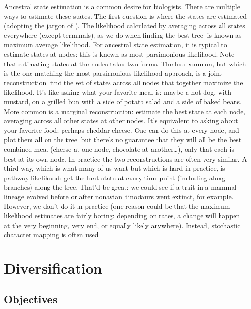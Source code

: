 \documentclass[]{article}
\begin{document}
Ancestral state estimation is a common desire for biologists. There are multiple ways to estimate these states. The first question is where the states are estimated (adopting the jargon of \citet{steel_parsimony_2000}). The likelihood calculated by averaging across all states everywhere (except terminals), as we do when finding the best tree, is known as maximum average likelihood. For ancestral state estimation, it is typical to estimate states at nodes: this is known as most-parsimonious likelihood. Note that estimating states at the nodes takes two forms. The less common, but which is the one matching the most-parsimonious likelihood approach, is a joint reconstruction: find the set of states across all nodes that together maximize the likelihood. It's like asking what your favorite meal is: maybe a hot dog, with mustard, on a grilled bun with a side of potato salad and a side of baked beans. More common is a marginal reconstruction: estimate the best state at each node, averaging across all other states at other nodes. It's equivalent to asking about your favorite food: perhaps cheddar cheese. One can do this at every node, and plot them all on the tree, but there's no guarantee that they will all be the best combined meal (cheese at one node, chocolate at another\ldots{}), only that each is best at its own node. In practice the two reconstructions are often very similar. A third way, which is what many of us want but which is hard in practice, is pathway likelihood: get the best state at every time point (including along branches) along the tree. That'd be great: we could see if a trait in a mammal lineage evolved before or after nonavian dinodaurs went extinct, for example. However, we don't do it in practice (one reason could be that the maximum likelihood estimates are fairly boring: depending on rates, a change will happen at the very beginning, very end, or equally likely anywhere). Instead, stochastic character mapping is often used \citep{huelsenbeck_stochastic_2003}

\hypertarget{diversification}{%
\section{Diversification}\label{diversification}}

\hypertarget{objectives-4}{%
\subsection{Objectives}\label{objectives-4}}
\end{document}
